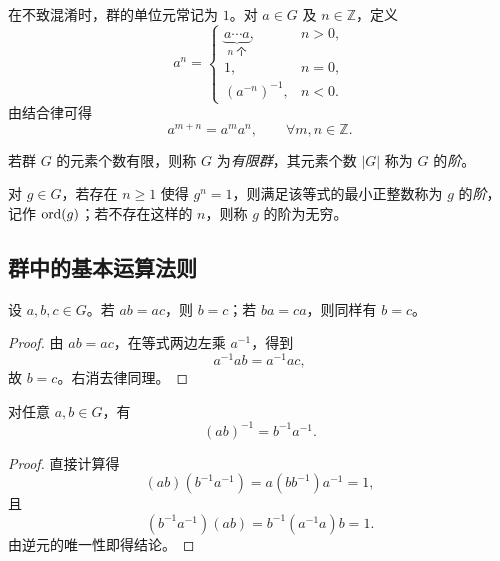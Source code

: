 在不致混淆时，群的单位元常记为 $1$。对 $a\in G$ 及 $n\in\mathbb Z$，定义
\[
  a^n=
  \begin{cases}
    \underbrace{a\cdots a}_{n\text{ 个}}, & n>0,\\
    1, & n=0,\\
    (a^{-n})^{-1}, & n<0.
  \end{cases}
\]
由结合律可得
\[
  a^{m+n}=a^m a^n,\qquad \forall m,n\in\mathbb Z.
\]

\begin{definition}[群与元素的阶]
若群 $G$ 的元素个数有限，则称 $G$ 为\emph{有限群}，其元素个数 $|G|$ 称为 $G$ 的\emph{阶}。

对 $g\in G$，若存在 $n\geq 1$ 使得 $g^n=1$，则满足该等式的最小正整数称为 $g$ 的\emph{阶}，记作 $\operatorname{ord}(g)$；若不存在这样的 $n$，则称 $g$ 的阶为无穷。
\end{definition}

\subsection{群中的基本运算法则}

\begin{theorem}[消去律]
设 $a,b,c\in G$。若 $ab=ac$，则 $b=c$；若 $ba=ca$，则同样有 $b=c$。
\end{theorem}

\begin{proof}
由 $ab=ac$，在等式两边左乘 $a^{-1}$，得到
\[
  a^{-1}ab=a^{-1}ac,
\]
故 $b=c$。右消去律同理。
\end{proof}

\begin{theorem}[乘积的逆]
对任意 $a,b\in G$，有
\[
  (ab)^{-1}=b^{-1}a^{-1}.
\]
\end{theorem}

\begin{proof}
直接计算得
\[
  (ab)(b^{-1}a^{-1})=a(bb^{-1})a^{-1}=1,
\]
且
\[
  (b^{-1}a^{-1})(ab)=b^{-1}(a^{-1}a)b=1.
\]
由逆元的唯一性即得结论。
\end{proof}



